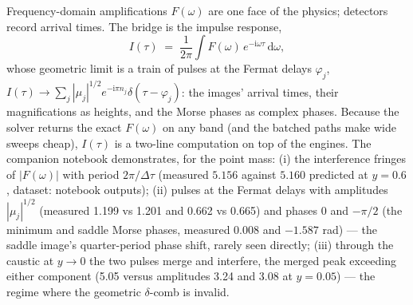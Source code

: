 \documentclass[11pt,a4paper]{article}
\newcommand{\Fresnel}{F}
\newcommand{\ii}{\mathrm{i}}
\newcommand{\dd}{\mathrm{d}}
\begin{document}
Frequency-domain amplifications $F(\omega)$ are one face of the physics; detectors record
arrival times.  The bridge is the impulse response,
\begin{equation}
  I(\tau) \;=\; \frac{1}{2\pi}\int \Fresnel(\omega)\,e^{-\ii\omega\tau}\,\dd\omega ,
  \label{eq:impulse}
\end{equation}
whose geometric limit is a train of pulses at the Fermat delays $\varphi_j$,
$I(\tau)\to\sum_j |\mu_j|^{1/2}e^{-\ii\pi n_j}\delta(\tau-\varphi_j)$: the images' arrival
times, their magnifications as heights, and the Morse phases as complex phases.  Because the
solver returns the exact $F(\omega)$ on any band (and the batched paths make wide sweeps
cheap), $I(\tau)$ is a two-line computation on top of the engines.  The companion notebook
 demonstrates, for the point mass:
(i) the interference fringes of $|F(\omega)|$ with period $2\pi/\Delta\tau$ (measured $5.156$
against $5.160$ predicted at $y=0.6$, dataset: notebook outputs);
(ii) pulses at the Fermat delays with amplitudes $|\mu_j|^{1/2}$ (measured 1.199 vs 1.201 and
0.662 vs 0.665) and phases $0$ and $-\pi/2$ (the minimum and saddle Morse phases, measured
$0.008$ and $-1.587$ rad) --- the saddle image's quarter-period phase shift, rarely seen
directly;
(iii) through the caustic at $y\to0$ the two pulses merge and interfere, the merged peak
exceeding either component (5.05 versus amplitudes 3.24 and 3.08 at $y=0.05$) --- the regime
where the geometric $\delta$-comb is invalid.
\end{document}
